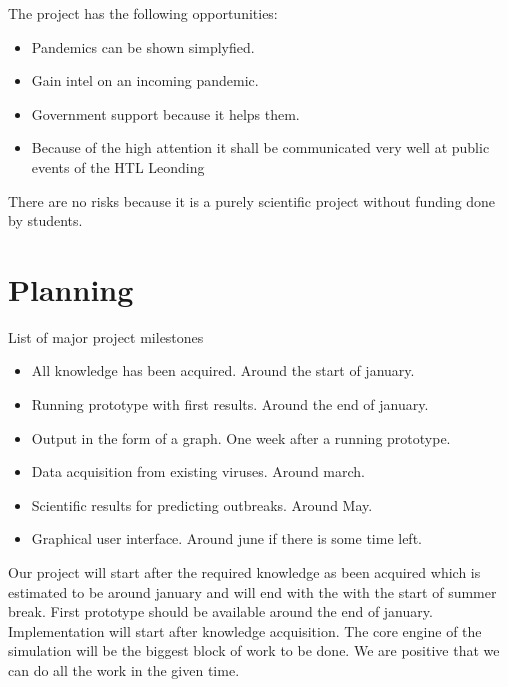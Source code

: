 \documentclass[12pt]{article}
\theoremstyle{definition}
\begin{document}
The project has the following opportunities:
\begin{itemize}
\item Pandemics can be shown simplyfied.
\item Gain intel on an incoming pandemic.
\item Government support because it helps them.
\item Because of the high attention it shall be communicated very well at public events of the HTL Leonding
\end{itemize}

There are no risks because it is a purely scientific project without funding done by students.

\pagebreak
\section{Planning}

List of major project milestones
\begin{itemize}
\item All knowledge has been acquired. Around the start of january.
\item Running prototype with first results. Around the end of january.
\item Output in the form of a graph. One week after a running prototype.
\item Data acquisition from existing viruses. Around march.
\item Scientific results for predicting outbreaks. Around May.
\item Graphical user interface. Around june if there is some time left.
\end{itemize}

Our project will start after the required knowledge as been acquired which is estimated to be around january and will end with the with the start of summer break.
First prototype should be available around the end of january.
Implementation will start after knowledge acquisition.
The core engine of the simulation will be the biggest block of work to be done.
We are positive that we can do all the work in the given time.
\end{document}

